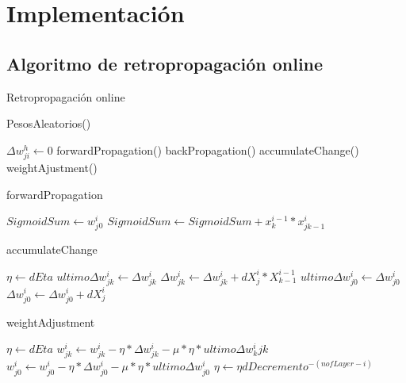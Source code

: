\section{Implementación}
\subsection{Algoritmo de retropropagación online}

\begin{algorithm}[H]
\caption{Retropropagación online}
\begin{algorithmic}[1]
\STATE PesosAleatorios()

	\STATE $\Delta w^h_{ji} \leftarrow 0$
	\STATE forwardPropagation()
	\STATE backPropagation()
	\STATE accumulateChange()
	\STATE weightAjustment()
\ENDFOR
\end{algorithmic}
\end{algorithm}


\begin{algorithm}[H]
\caption{forwardPropagation}
\begin{algorithmic}[1]

	\STATE $SigmoidSum \leftarrow w^i_j{}_0$
			\STATE $SigmoidSum \leftarrow SigmoidSum + x^{i-1}_k * 			x^{i}_{jk-1}$
		\ENDFOR
\ENDFOR
\ENDFOR
\end{algorithmic}
\end{algorithm}

\begin{algorithm}[H]
\caption{accumulateChange}
\begin{algorithmic}[1]
\STATE $\eta \leftarrow dEta$
		\STATE $ultimo \Delta w^i_{jk} \leftarrow \Delta w^i_{jk}$
		\STATE $\Delta w^i_{jk} \leftarrow \Delta w^i_{jk} + dX^i_j * X^{i-1}_{k-1}$
	\ENDFOR
	\STATE $ultimo \Delta w^i_{j0} \leftarrow \Delta w^i_{j0}$
	\STATE $\Delta w^i_{j0} \leftarrow \Delta w^i_{j0} + dX^i_j$
\ENDFOR
\ENDFOR
\end{algorithmic}
\end{algorithm}

\begin{algorithm}[H]
\caption{weightAdjustment}
\begin{algorithmic}[1]
\STATE $\eta \leftarrow dEta$
		\STATE $w^i_{jk} \leftarrow w^i_{jk} - \eta * \Delta w^i_{jk} - \mu * \eta * ultimo \Delta w^i_k{jk}$
	\ENDFOR
		\STATE $w^i_{j0} \leftarrow w^i_{j0} - \eta * \Delta w^i_{j0} - \mu * \eta * ultimo \Delta w^i_{j0}$
\ENDFOR
\STATE $\eta \leftarrow \eta dDecremento^{-(nofLayer-i)}$
\ENDFOR
\end{algorithmic}
\end{algorithm}
